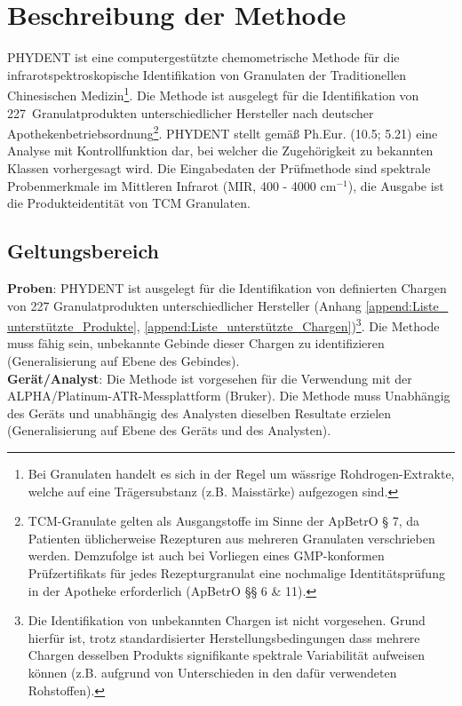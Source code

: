 \documentclass[11pt, a4paper]{article}
\newcommand\VersionPhEur{10.5}
\newcommand\AnzahlProdukte{227}
\begin{document}
\newpage
\tableofcontents

\newpage

\section{Beschreibung der Methode}
PHYDENT ist eine computergestützte chemometrische Methode für die infrarotspektroskopische Identifikation von Granulaten der Traditionellen Chinesischen Medizin\footnote{Bei Granulaten handelt es sich in der Regel um wässrige Rohdrogen-Extrakte, welche auf eine Trägersubstanz (z.B. Maisstärke) aufgezogen sind.}. Die Methode ist ausgelegt für die Identifikation von \AnzahlProdukte\ Granulatprodukten unterschiedlicher Hersteller nach deutscher Apothekenbetriebsordnung\footnote{TCM-Granulate gelten als Ausgangstoffe im Sinne der ApBetrO § 7, da Patienten üblicherweise Rezepturen aus mehreren Granulaten verschrieben werden. Demzufolge ist auch bei Vorliegen eines GMP-konformen Prüfzertifikats für jedes Rezepturgranulat eine nochmalige Identitätsprüfung in der Apotheke erforderlich (ApBetrO §§ 6 \& 11).}.  PHYDENT stellt gemäß Ph.Eur. (\VersionPhEur; 5.21) eine Analyse mit Kontrollfunktion dar, bei welcher die Zugehörigkeit zu bekannten Klassen vorhergesagt wird. Die Eingabedaten der Prüfmethode sind spektrale Probenmerkmale im Mittleren Infrarot (MIR, 400 - 4000 cm$^{-1}$), die Ausgabe ist die Produkteidentität von TCM Granulaten.



\subsection{Geltungsbereich}

\textbf{Proben}: PHYDENT ist ausgelegt für die Identifikation von definierten Chargen von 227 Granulatprodukten unterschiedlicher Hersteller (Anhang \ref{append:Liste_ unterstützte_Produkte}, \ref{append:Liste_unterstützte_Chargen})\footnote{Die Identifikation von unbekannten Chargen ist nicht vorgesehen. Grund hierfür ist, trotz standardisierter Herstellungsbedingungen dass mehrere Chargen desselben Produkts signifikante spektrale Variabilität aufweisen können (z.B. aufgrund von Unterschieden in den dafür verwendeten Rohstoffen).}.  Die Methode muss fähig sein, unbekannte Gebinde dieser Chargen zu identifizieren (Generalisierung auf Ebene des Gebindes). \\

\textbf{Gerät/Analyst}: Die Methode ist vorgesehen für die Verwendung mit der ALPHA/Platinum-ATR-Messplattform (Bruker). Die Methode muss Unabhängig des Geräts und unabhängig des Analysten dieselben Resultate erzielen (Generalisierung auf Ebene des Geräts und des Analysten).
\end{document}
